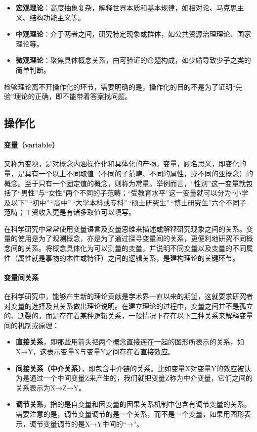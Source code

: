 \begin{itemize}
	\item
	\textbf{宏观理论}：高度抽象复杂，解释世界本质和基本规律，如相对论、马克思主义、结构功能主义等。
	\item
	\textbf{中观理论}：介于两者之间，研究特定现象或群体，如公共资源治理理论、国家理论等。
	\item
	\textbf{微观理论}：聚焦具体概念关系，由可验证的命题构成，如少婚导致少子之类的简单判断。
\end{itemize}

检验理论离不开操作化的环节，需要明确的是，操作化的目的不是为了证明``先验''理论的正确，即不能带着答案找问题。

\subsection{操作化}

\paragraph*{变量（variable）}


又称为变项，是对概念内涵操作化和具体化的产物。变量，顾名思义，即变化的量，是具有一个以上不同取值（不同的子范畴、不同的属性，或不同的亚概念）的概念。至于只有一个固定值的概念，则称为常量。举例而言，``性别''这一变量就包括了``男性''与``女性''两个不同的子范畴；``受教育水平''这一变量就可以分为``小学及以下''\,``初中''\,``高中''\,``大学本科或专科''\,``硕士研究生''\,``博士研究生''六个不同子范畴；工资收入更是有诸多取值可以填写。


在科学研究中常常使用变量语言及变量思维来描述或解释研究现象之间的关系。变量的使用是为了观测概念，亦是为了通过探寻变量间的关系，更便利地研究不同概念间的关系。将概念具体化为可以测量的变量，并说明不同变量以及变量的不同属性（属性就是事物的本性或特征）之间的逻辑关系，是建构理论的关键环节。

\paragraph*{变量间关系}

在科学研究中，能够产生新的理论贡献是学术界一直以来的期望，这就要求研究者对变量的选择及其关系做出理论说明。在建立理论的过程中，变量之间并不是孤立的、割裂的，而是存在着某种逻辑关系，一般情况下存在以下三种关系来解释变量间的机制或原理：

\begin{itemize}
	\item
	\textbf{直接关系}，即那些用箭头把两个概念直接连在一起的图形所表示的关系，如X→Y，这表示变量X与变量Y之间存在着直接效应。
	\item
	\textbf{间接关系（中介关系）}，即包含中介链的关系。比如变量X对变量Y的效应被认为是通过一个中间变量Z来产生的，我们就把变量Z称为中介变量，它们之间的关系表示为X→Z→Y。
	\item
	\textbf{调节关系}，指的是自变量和因变量的因果关系机制中包含有调节变量的关系。需要注意的是，调节变量调节的是一个关系，而不是一个变量，如果用图形表示，调节变量调节的是X→Y中间的``→''。
\end{itemize}

